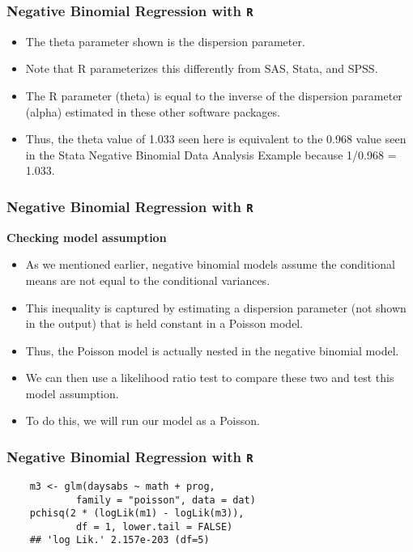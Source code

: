 \documentclass[MASTER.tex]{subfiles}
\begin{document}
\begin{frame}[fragile]
	\frametitle{Negative Binomial Regression with \texttt{R} }
	\Large
\begin{itemize}
	\item The theta parameter shown is the dispersion parameter. 
	\item Note that R parameterizes this differently from SAS, Stata, and SPSS. 
	\item The R parameter (theta) is equal to the inverse of the dispersion parameter (alpha) estimated in these other software packages. 
	\item Thus, the theta value of 1.033 seen here is equivalent to the 0.968 value seen in the Stata Negative Binomial Data Analysis Example because 1/0.968 = 1.033.
\end{itemize}
\end{frame}
\begin{frame}[fragile]
	\frametitle{Negative Binomial Regression with \texttt{R} }
	\Large
	
	\textbf{Checking model assumption}
\begin{itemize}
	\item	
	As we mentioned earlier, negative binomial models assume the conditional means are not equal to the conditional 
	variances. 
	\item This inequality is captured by estimating a dispersion parameter (not shown in the output) that is held
	constant in a Poisson model. 
	\item Thus, the Poisson model is actually nested in the negative binomial model. 
	\item We can then use a likelihood ratio test to compare these two and test this model assumption. 
	\item To do this, we will run our model as a Poisson.
\end{itemize}
\end{frame}
\begin{frame}[fragile]
	\frametitle{Negative Binomial Regression with \texttt{R} }
	\large
	\begin{verbatim}
	m3 <- glm(daysabs ~ math + prog, 
	        family = "poisson", data = dat)
	pchisq(2 * (logLik(m1) - logLik(m3)), 
	        df = 1, lower.tail = FALSE)
	## 'log Lik.' 2.157e-203 (df=5)
	\end{verbatim}
	\Large
	\end{frame}
\end{document}
